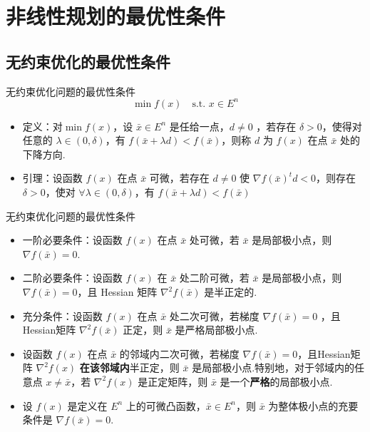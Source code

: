 \section{非线性规划的最优性条件}
\subsection{无约束优化的最优性条件}
\begin{note}
    无约束优化问题的最优性条件\[\min f(x) \quad \text{s.t. } x \in E^n\]
    \begin{itemize}
        \item 定义：对$\min f(x)$，设 $\bar{x} \in E^n$ 是任给一点，$d\neq 0$ ，若存在 $\delta > 0$，使得对任意的 $\lambda \in (0, \delta)$，有 $f(\bar{x} + \lambda d) < f(\bar{x})$，则称 $d$ 为 $f(x)$ 在点 $\bar{x}$ 处的下降方向.
        \item 引理：设函数 $f(x)$ 在点 $\bar{x}$ 可微，若存在 $d \neq 0$ 使 $\nabla f(\bar{x})^td < 0$，则存在 $\delta > 0$，使对 $\forall \lambda\in (0, \delta)$，有 $f(\bar{x} + \lambda d) < f(\bar{x})$
    \end{itemize}
\end{note}

\begin{theorem}
    无约束优化问题的最优性条件\begin{itemize}
        \item 一阶必要条件：设函数 $f(x)$ 在点 $\bar{x}$ 处可微，若 $\bar{x}$ 是局部极小点，则 $\nabla f(\bar{x}) = 0$.
        \item 二阶必要条件：设函数 $f(x)$ 在 $\bar{x}$ 处二阶可微，若 $\bar{x}$ 是局部极小点，则 $\nabla f(\bar{x}) = 0$，且 Hessian 矩阵 $\nabla^2f(\bar{x})$ 是半正定的.
        \item 充分条件：设函数 $f(x)$ 在点 $\bar{x}$ 处二次可微，若梯度 $\nabla f(\bar{x}) = 0$ ，且 Hessian矩阵 $\nabla^2f(\bar{x})$ 正定，则 $\bar{x}$ 是严格局部极小点.
        \item 设函数 $f(x)$ 在点 $\bar{x}$ 的邻域内二次可微，若梯度 $\nabla f(\bar{x}) = 0$，且Hessian矩阵 $\nabla^2f(x)$ \textbf{在该邻域内}半正定，则 $\bar{x}$ 是局部极小点.特别地，对于邻域内的任意点 $x\neq \bar{x}$，若 $\nabla^2f(x)$ 是正定矩阵，则 $\bar{x}$ 是一个\textbf{严格}的局部极小点.
        \item 设 $f(x)$ 是定义在 $E^n$ 上的可微凸函数，$\bar{x} \in E^n$，则 $\bar{x}$ 为整体极小点的充要条件是 $\nabla f(\bar{x}) = 0$.
    \end{itemize}
\end{theorem}

